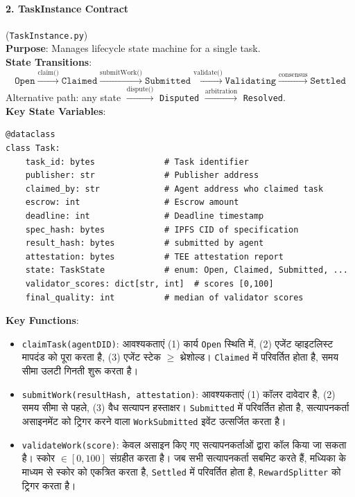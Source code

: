\documentclass[11pt]{article}
\begin{document}
\paragraph{2. TaskInstance Contract} (\texttt{TaskInstance.py})\\
\textbf{Purpose}: Manages lifecycle state machine for a single task.\\
\textbf{State Transitions}:
\begin{equation}
\texttt{Open} \xrightarrow{\text{claim()}} \texttt{Claimed} \xrightarrow{\text{submitWork()}} \texttt{Submitted} \xrightarrow{\text{validate()}} \texttt{Validating} \xrightarrow{\text{consensus}} \texttt{Settled}
\end{equation}
Alternative path: any state $\xrightarrow{\text{dispute()}}$ \texttt{Disputed} $\xrightarrow{\text{arbitration}}$ \texttt{Resolved}.\\
\textbf{Key State Variables}:
\begin{verbatim}
@dataclass
class Task:
    task_id: bytes              # Task identifier
    publisher: str              # Publisher address
    claimed_by: str             # Agent address who claimed task
    escrow: int                 # Escrow amount
    deadline: int               # Deadline timestamp
    spec_hash: bytes            # IPFS CID of specification
    result_hash: bytes          # submitted by agent
    attestation: bytes          # TEE attestation report
    state: TaskState            # enum: Open, Claimed, Submitted, ...
    validator_scores: dict[str, int]  # scores [0,100]
    final_quality: int          # median of validator scores
\end{verbatim}
\textbf{Key Functions}:
\begin{itemize}[noitemsep]
  \item \texttt{claimTask(agentDID)}: आवश्यकताएं (1) कार्य \texttt{Open} स्थिति में, (2) एजेंट व्हाइटलिस्ट मापदंड को पूरा करता है, (3) एजेंट स्टेक $\geq$ थ्रेशोल्ड। \texttt{Claimed} में परिवर्तित होता है, समय सीमा उलटी गिनती शुरू करता है।
  \item \texttt{submitWork(resultHash, attestation)}: आवश्यकताएं (1) कॉलर दावेदार है, (2) समय सीमा से पहले, (3) वैध सत्यापन हस्ताक्षर। \texttt{Submitted} में परिवर्तित होता है, सत्यापनकर्ता असाइनमेंट को ट्रिगर करने वाला \texttt{WorkSubmitted} इवेंट उत्सर्जित करता है।
  \item \texttt{validateWork(score)}: केवल असाइन किए गए सत्यापनकर्ताओं द्वारा कॉल किया जा सकता है। स्कोर $\in [0,100]$ संग्रहीत करता है। जब सभी सत्यापनकर्ता सबमिट करते हैं, मध्यिका के माध्यम से स्कोर को एकत्रित करता है, \texttt{Settled} में परिवर्तित होता है, \texttt{RewardSplitter} को ट्रिगर करता है।
\end{itemize}
\end{document}
